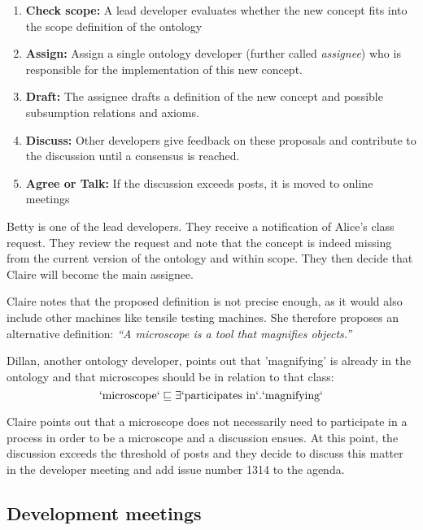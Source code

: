 \begin{enumerate}
    \item \textbf{Check scope: } A lead developer evaluates whether the new concept fits into the scope definition of the ontology
    \item \textbf{Assign:} Assign a single ontology developer (further called \textit{assignee}) who is responsible for the implementation of this new concept.
    \item \textbf{Draft:} The assignee drafts a definition of the new concept and possible subsumption relations and axioms.
    \item \textbf{Discuss:} Other developers give feedback on these proposals and contribute to the discussion until a consensus is reached.
    \item \textbf{Agree or Talk:} If the discussion exceeds {\issuediscussionlimit} posts, it is moved to online meetings
\end{enumerate}

\begin{example}
    Betty is one of the lead developers. They receive a notification of Alice's class request. They review the request and note that the concept is indeed missing from the current version of the ontology and within scope. They then decide that Claire will become the main assignee.

    Claire notes that the proposed definition is not precise enough, as it would also include other machines like tensile testing machines. She therefore proposes an alternative definition: \textit{``A microscope is a tool that magnifies objects.''}

    Dillan, another ontology developer, points out that 'magnifying' is already in the ontology and that microscopes should be in relation to that class: 
    \[\mathrm{`microscope`} \sqsubseteq \exists \mathrm{`participates~in`}.\mathrm{`magnifying`}\]

    Claire points out that a microscope does not necessarily need to participate in a process in order to be a microscope and a discussion ensues. At this point, the discussion exceeds the threshold of {\issuediscussionlimit} posts and they decide to discuss this matter in the developer meeting and add issue number 1314 to the agenda.
\end{example}

\subsection{Development meetings}

